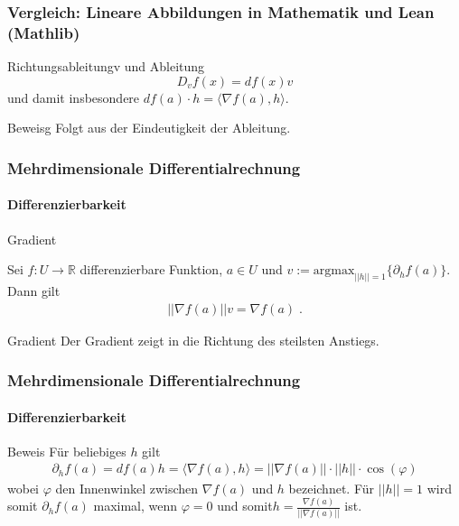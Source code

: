 \documentclass{beamer}
\begin{document}
         
    \begin{frame}
        \frametitle{Vergleich: Lineare Abbildungen in Mathematik und Lean (Mathlib)}
        
        
        \begin{block}{Richtungsableitungv und Ableitung}
            \[
                D_v f (x) = df(x) v
            \]
            und damit insbesondere  $df(a) \cdot h = \langle \nabla f (a) , h \rangle$.
        \end{block}

        \begin{block}{Beweisg}
            Folgt aus der Eindeutigkeit der Ableitung.
        \end{block}
    \end{frame}

    
    \begin{frame}
        \frametitle{Mehrdimensionale Differentialrechnung}
    \framesubtitle{Differenzierbarkeit}
        \begin{block}{Gradient}
    
    Sei   $f: U \to \mathbb{R}$ differenzierbare Funktion,  $a \in U$ und $v := \text{argmax}_{ ||h|| = 1 } \{ \partial_h f(a) \}$.
    Dann gilt 
    \begin{align*}
    || \nabla f(a) || v =  \nabla f(a) \; .
    \end{align*} 
    \end{block}
    \begin{block}{Gradient}
    Der Gradient zeigt in die Richtung des steilsten Anstiegs.
    \end{block}
    
     \end{frame}
    
    \begin{frame}
        \frametitle{Mehrdimensionale Differentialrechnung}
    \framesubtitle{Differenzierbarkeit}
        \begin{block}{Beweis}
    Für beliebiges $h$ gilt 
    \begin{align*}
    \partial_h f(a) = df(a) h = \langle \nabla f(a) , h \rangle = || \nabla f(a)||  \cdot ||h|| \cdot \cos(\varphi) 
    \end{align*} 
    wobei $\varphi$ den Innenwinkel zwischen $\nabla f(a)$ und $h$ bezeichnet. Für $||h|| = 1$ wird somit $\partial_h f(a) $ maximal, wenn $\varphi = 0$ und somit$h =  \frac{\nabla f(a)}{||\nabla f(a)||}$ ist.
    \end{block}
    
     \end{frame}
    
\end{document}

